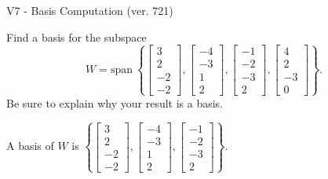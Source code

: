 \begin{exercise}
  \begin{exerciseTitle}V7 - Basis Computation (ver. 721)\end{exerciseTitle}
  \begin{exerciseStatement}
    Find a basis for the subspace 
\[W=\mathrm{span}\ \left\{\left[\begin{array}{r}
3 \\
2 \\
-2 \\
-2
\end{array}\right] , \left[\begin{array}{r}
-4 \\
-3 \\
1 \\
2
\end{array}\right] , \left[\begin{array}{r}
-1 \\
-2 \\
-3 \\
2
\end{array}\right] , \left[\begin{array}{r}
4 \\
2 \\
-3 \\
0
\end{array}\right]\right\}.\]
 Be sure to explain why your result is a basis.


  \end{exerciseStatement}
  \begin{exerciseAnswer}
   A basis of \(W\) is  \(\left\{\left[\begin{array}{r}
3 \\
2 \\
-2 \\
-2
\end{array}\right] , \left[\begin{array}{r}
-4 \\
-3 \\
1 \\
2
\end{array}\right] , \left[\begin{array}{r}
-1 \\
-2 \\
-3 \\
2
\end{array}\right]\right\}\).
  


  \end{exerciseAnswer}
\end{exercise}